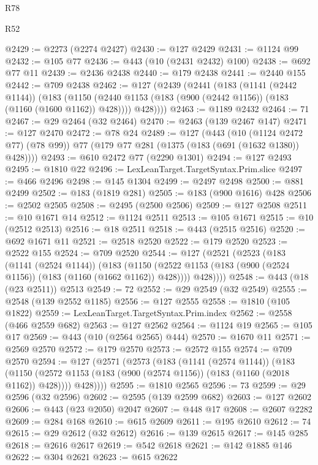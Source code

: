 \begin{lexlean}{R78}
\begin{lexlean}{R52}
\begin{coremodule}
{{{{{{{{{{{{{{{{{{{{{{{{{{{{{{{{{{{{{{{{{{{{{{{{{{{{{{{{{{{{{{{{{{{{{{{{{{{{{{{{{{{{{{{{{{{{{{{{{{{{{{{{{{{{{{{{{{{{{{{{{{{{{{{{{{{{{{{{{{{{{{{{{{{{{{{{{{{{{{{{{{{{{{{{{{{{{{{{{{{{{{{{{{{{{{{{{{{{{{@2429 := @2273 (@2274 @2427)
@2430 := @127 @2429
@2431 := @1124 @99
@2432 := @105 @77
@2436 := @443 (@10 (@2431 @2432) @100)
@2438 := @692 @77 @11
@2439 := @2436 @2438
@2440 := @179 @2438
@2441 := @2440 @155
@2442 := @709 @2438
@2462 := @127
    (@2439
      (@2441
        (@183
          (@1141 (@2442 @1144))
          (@183
            (@1150 (@2440 @1153 (@183 (@900 (@2442 @1156)) (@183 (@1160 (@1600 @1162)) @428))))
            @428))))
@2463 := @1189 @2432
@2464 := 71
@2467 := @29 @2464 (@32 @2464)
@2470 := @2463 (@139 @2467 @147)
@2471 := @127 @2470
@2472 := @78 @24
@2489 := @127
    (@443
      (@10 (@1124 @2472 @77) (@78 @99))
      @77
      (@179 @77 @281 (@1375 (@183 (@691 (@1632 @1380)) @428))))
@2493 := @610 @2472 @77 (@2290 @1301)
@2494 := @127 @2493
@2495 := @1810 @22
@2496 := LexLeanTarget.TargetSyntax.Prim.slice
@2497 := @466 @2496
@2498 := @145 @1304
@2499 := @2497 @2498
@2500 := @881 @2499
@2502 := @183 (@1819 @281)
@2505 := @183 (@900 @1616) @428
@2506 := @2502 @2505
@2508 := @2495 (@2500 @2506)
@2509 := @127 @2508
@2511 := @10 @1671 @14
@2512 := @1124 @2511
@2513 := @105 @1671
@2515 := @10 (@2512 @2513)
@2516 := @18 @2511
@2518 := @443 (@2515 @2516)
@2520 := @692 @1671 @11
@2521 := @2518 @2520
@2522 := @179 @2520
@2523 := @2522 @155
@2524 := @709 @2520
@2544 := @127
    (@2521
      (@2523
        (@183
          (@1141 (@2524 @1144))
          (@183
            (@1150 (@2522 @1153 (@183 (@900 (@2524 @1156)) (@183 (@1160 (@1662 @1162)) @428))))
            @428))))
@2548 := @443 (@18 (@23 @2511)) @2513
@2549 := 72
@2552 := @29 @2549 (@32 @2549)
@2555 := @2548 (@139 @2552 @1185)
@2556 := @127 @2555
@2558 := @1810 (@105 @1822)
@2559 := LexLeanTarget.TargetSyntax.Prim.index
@2562 := @2558 (@466 @2559 @682)
@2563 := @127 @2562
@2564 := @1124 @19
@2565 := @105 @17
@2569 := @443 (@10 (@2564 @2565) @444)
@2570 := @1670 @11
@2571 := @2569 @2570
@2572 := @179 @2570
@2573 := @2572 @155
@2574 := @709 @2570
@2594 := @127
    (@2571
      (@2573
        (@183
          (@1141 (@2574 @1144))
          (@183
            (@1150 (@2572 @1153 (@183 (@900 (@2574 @1156)) (@183 (@1160 (@2018 @1162)) @428))))
            @428))))
@2595 := @1810 @2565
@2596 := 73
@2599 := @29 @2596 (@32 @2596)
@2602 := @2595 (@139 @2599 @682)
@2603 := @127 @2602
@2606 := @443 (@23 @2050) @2047
@2607 := @448 @17
@2608 := @2607 @2282
@2609 := @284 @168
@2610 := @615 @2609
@2611 := @195 @2610
@2612 := 74
@2615 := @29 @2612 (@32 @2612)
@2616 := @139 @2615
@2617 := @145 @285
@2618 := @2616 @2617
@2619 := @542 @2618
@2621 := @142 @1885 @146
@2622 := @304 @2621
@2623 := @615 @2622
}}}}}}}}}}}}}}}}}}}}}}}}}}}}}}}}}}}}}}}}}}}}}}}}}}}}}}}}}}}}}}}}}}}}}}}}}}}}}}}}}}}}}}}}}}}}}}}}}}}}}}}}}}}}}}}}}}}}}}}}}}}}}}}}}}}}}}}}}}}}}}}}}}}}}}}}}}}}}}}}}}}}}}}}}}}}}}}}}}}}}}}}}}}}}}}}}}}}}}
\end{coremodule}
\end{lexlean}
\end{lexlean}
